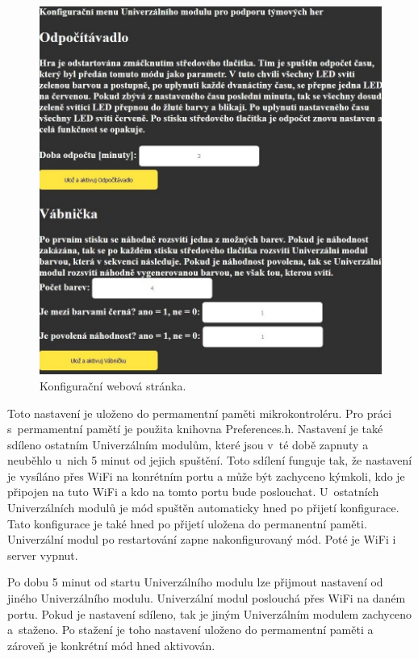 \begin{figure}[!h]
  \begin{center}
    \includegraphics[scale=0.45]{obrazky/konfiguracni_webova_stranka.jpg}
  \end{center}
  \caption[Konfigurační webová stránka]{Konfigurační webová stránka.}
\end{figure}

Toto nastavení je uloženo do permamentní paměti mikrokontroléru. Pro práci s~permamentní pamětí je použita knihovna Preferences.h. Nastavení je také sdíleno ostatním Univerzálním modulům, které jsou v~té době zapnuty 
a neuběhlo u~nich 5 minut od jejich spuštění. Toto sdílení funguje tak, že nastavení je vysíláno přes WiFi na konrétním portu a může být zachyceno kýmkoli, kdo je připojen na tuto WiFi a kdo na tomto portu bude 
poslouchat. U~ostatních Univerzálních modulů je mód spuštěn automaticky hned po přijetí konfigurace. Tato konfigurace je také hned po přijetí uložena do permanentní paměti. Univerzální modul po restartování zapne 
nakonfigurovaný mód. Poté je WiFi i server vypnut. 

Po dobu 5 minut od startu Univerzálního modulu lze přijmout nastavení od jiného Univerzálního modulu. Univerzální modul poslouchá přes WiFi na daném portu. Pokud je nastavení sdíleno, tak je jiným Univerzálním modulem 
zachyceno a~staženo. Po stažení je toho nastavení uloženo do permamentní paměti a zároveň je konkrétní mód hned aktivován. 

